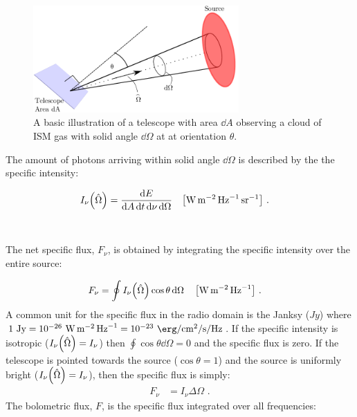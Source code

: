 \begin{figure}
	\centering
	\includegraphics[width=0.7\textwidth]{06_Interstellar_Medium/Images/Theory/intensity.pdf}
	\caption{A basic illustration of a telescope with area $\dd{A}$ observing a cloud of ISM gas with solid angle $\dd{\Omega}$ at at orientation $\theta$.}
	\label{fig:telescope_basic_diagram2}
\end{figure}
\noindent The amount of photons arriving within solid angle $\dd{\Omega}$ is described by the the specific intensity:

\begin{equation}
	\begin{aligned}
		I_\nu\qty(\hat{\Omega})&=\frac{\dd{E}}{\dd{A}\dd{t}\dd{\nu}\dd{\Omega}}\quad\qty[\si{\watt\per\meter\squared\per\hertz\per\steradian}]\text{ .}
	\end{aligned}
\end{equation}
\par~\par 
\noindent The net specific flux, $F_\nu$, is obtained by integrating the specific intensity over the entire source:

\begin{equation}
	\begin{aligned}
		F_\nu &=\oint I_\nu\qty(\hat{\Omega})\cos\theta\dd{\Omega}\quad\qty[\si{\watt\per\meter\squared\per\hertz}]\text{ .}
	\end{aligned}
\end{equation}
\noindent A common unit for the specific flux in the radio domain is the Janksy ($\si{Jy}$) where $1~\si{Jy}=10^{-26}~\si{\watt\per\meter\squared\per\hertz} = 10^{-23}~\si{\erg\per\centi\meter\squared\per\second\per\hertz}$. If the specific intensity is isotropic ($I_\nu\qty(\hat{\Omega})=I_\nu$) then $\oint \cos\theta\dd{\Omega}=0$ and the specific flux is zero. If the telescope is pointed towards the source ($\cos\theta=1$) and the source is uniformly bright ($I_\nu\qty(\hat{\Omega})=I_\nu$), then the specific flux is simply:
\begin{equation}
	\begin{aligned}
		F_\nu&=I_\nu\Delta\Omega\text{ .}
	\end{aligned}\label{eq:specifc_flux_uniform_source}
\end{equation}
\noindent The bolometric flux, $F$, is the specific flux integrated over all frequencies:

